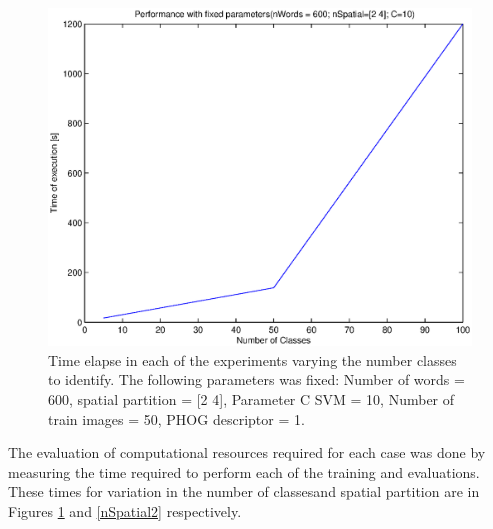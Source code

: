 \documentclass[10pt,twocolumn,letterpaper]{article}
\begin{document}
\begin{figure}[h]
\begin{center}
\includegraphics[width=1\linewidth]{images/nClass2.eps}
\end{center}
   \caption{
Time elapse in each of the experiments varying the number classes to identify. The following parameters was fixed: Number of words = 600, spatial partition = [2 4], Parameter C SVM = 10, Number of train images = 50, PHOG descriptor = 1.
   }
\label{nClass2}
\end{figure}

The evaluation of computational resources required for each case was done by measuring the time required to perform each of the training and evaluations. These times for variation in the number of classesand spatial partition are in Figures \ref{nClass2} and \ref{nSpatial2} respectively.
\end{document}
